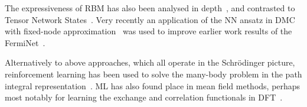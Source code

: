 The expressiveness of RBM has also been analysed in depth~\cite{carleo2018constructing}, and contrasted to Tensor Network States~\cite{clark2018unifying}. Very recently an application of the NN ansatz in DMC with fixed-node approximation~\cite{wilson2021simulations} was used to improve earlier work results of the FermiNet~\cite{pfau2020ab}.

Alternatively to above approaches, which all operate in the Schr\" odinger picture, reinforcement learning has been used to solve the many-body problem in the path integral representation~\cite{barr2020quantum, gispen2020ground}. ML has also found place in mean field methods, perhaps most notably for learning the exchange and correlation functionals in DFT~\cite{dick2020machine}.

